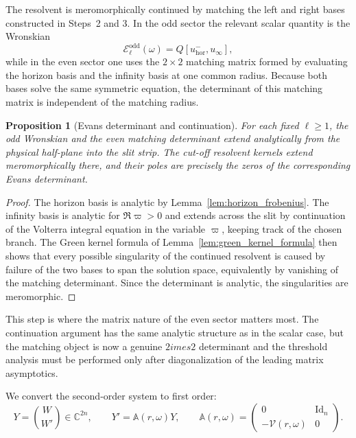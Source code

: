 \documentclass[12pt]{article}
\numberwithin{equation}{section}
\theoremstyle{plain}
\newtheorem{proposition}[theorem]{Proposition}
\theoremstyle{definition}
\theoremstyle{remark}
\newcommand{\C}{\mathbb C}
\newcommand{\hor}{\mathrm{hor}}
\newcommand{\cE}{\mathcal E}
\newcommand{\om}{\omega}
\newcommand{\vp}{\varpi}
\newcommand{\Id}{\mathrm{Id}}
\begin{document}
The resolvent is meromorphically continued by matching the left and right bases constructed in Steps~2 and 3.  In the odd sector the relevant scalar quantity is the Wronskian
\[
   \cE_{\ell}^{\mathrm{odd}}(\om)=Q[u_{\hor}^-,u_{\infty}],
\]
while in the even sector one uses the $2\times2$ matching matrix formed by evaluating the horizon basis and the infinity basis at one common radius.  Because both bases solve the same symmetric equation, the determinant of this matching matrix is independent of the matching radius.

\begin{proposition}[Evans determinant and continuation]\label{prop:evans_detailed}
For each fixed $\ell\ge1$, the odd Wronskian and the even matching determinant extend analytically from the physical half-plane into the slit strip.  The cut-off resolvent kernels extend meromorphically there, and their poles are precisely the zeros of the corresponding Evans determinant.
\end{proposition}

\begin{proof}
The horizon basis is analytic by Lemma~\ref{lem:horizon_frobenius}.  The infinity basis is analytic for $\Re\vp>0$ and extends across the slit by continuation of the Volterra integral equation in the variable $\vp$, keeping track of the chosen branch.  The Green kernel formula of Lemma~\ref{lem:green_kernel_formula} then shows that every possible singularity of the continued resolvent is caused by failure of the two bases to span the solution space, equivalently by vanishing of the matching determinant.  Since the determinant is analytic, the singularities are meromorphic.
\end{proof}

This step is where the matrix nature of the even sector matters most.  The continuation argument has the same analytic structure as in the scalar case, but the matching object is now a genuine $2	imes2$ determinant and the threshold analysis must be performed only after diagonalization of the leading matrix asymptotics.


We convert the second-order system to first order:
\begin{equation}\label{eq:first_order_system}
   Y=\binom{W}{W'}\in\C^{2n},
   \qquad
   Y'=\mathbb A(r,\om)Y,
   \qquad
   \mathbb A(r,\om)=
   \begin{pmatrix}
      0&\Id_n\\
      -\mathcal V(r,\om)&0
   \end{pmatrix}.
\end{equation}
\end{document}
